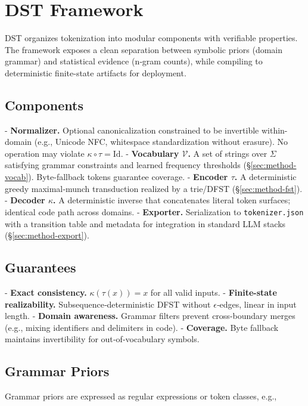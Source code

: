 \section{DST Framework}
\label{sec:framework}

DST organizes tokenization into modular components with verifiable properties. The framework exposes a clean separation between symbolic priors (domain grammar) and statistical evidence (n‑gram counts), while compiling to deterministic finite-state artifacts for deployment.

\subsection{Components}

- \textbf{Normalizer.} Optional canonicalization constrained to be invertible within-domain (e.g., Unicode NFC, whitespace standardization without erasure). No operation may violate $\kappa\!\circ\!\tau = \mathrm{Id}$.
- \textbf{Vocabulary $\mathcal{V}$.} A set of strings over $\Sigma$ satisfying grammar constraints and learned frequency thresholds (\S\ref{sec:method-vocab}). Byte-fallback tokens guarantee coverage.
- \textbf{Encoder $\tau$.} A deterministic greedy maximal‑munch transduction realized by a trie/DFST (\S\ref{sec:method-fst}).
- \textbf{Decoder $\kappa$.} A deterministic inverse that concatenates literal token surfaces; identical code path across domains.
- \textbf{Exporter.} Serialization to \texttt{tokenizer.json} with a transition table and metadata for integration in standard LLM stacks (\S\ref{sec:method-export}).

\subsection{Guarantees}

- \textbf{Exact consistency.} $\kappa(\tau(x))=x$ for all valid inputs.
- \textbf{Finite-state realizability.} Subsequence‑deterministic DFST without $\epsilon$‐edges, linear in input length.
- \textbf{Domain awareness.} Grammar filters prevent cross-boundary merges (e.g., mixing identifiers and delimiters in code).
- \textbf{Coverage.} Byte fallback maintains invertibility for out‑of‑vocabulary symbols.

\subsection{Grammar Priors}

Grammar priors are expressed as regular expressions or token classes, e.g.,

